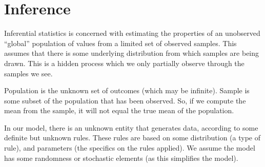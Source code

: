 \documentclass[a4paper, openany]{memoir}
\begin{document}

\section{Inference}
Inferential statistics is concerned with estimating the properties of an unobserved ``global'' population of values from a limited set of observed samples. This assumes that there is some underlying distribution from which samples are being drawn. This is a hidden process which we only partially observe through the samples we see.

Population is the unknown set of outcomes (which may be infinite). Sample is some subset of the population that has been observed. So, if we compute the mean from the sample, it will not equal the true mean of the population.

In our model, there is an unknown entity that generates data, according to some definite but unknown rules. These rules are based on some distribution (a type of rule), and parameters (the specifics on the rules applied). We assume the model has some randomness or stochastic elements (as this simplifies the model).
\end{document}
